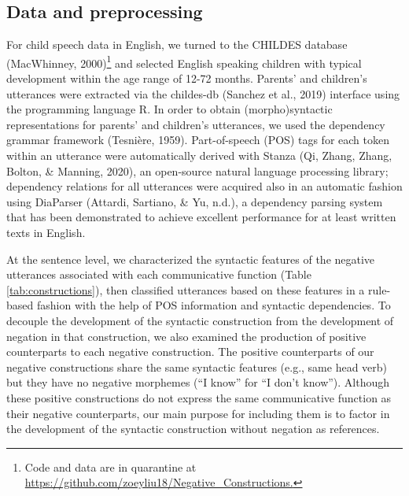 \documentclass[
  english,
  man,floatsintext]{apa6}
\begin{document}
\hypertarget{data-and-preprocessing}{%
\subsection{Data and preprocessing}\label{data-and-preprocessing}}

For child speech data in English, we turned to the CHILDES database (MacWhinney, 2000)\footnote{Code and data are in quarantine at \url{https://github.com/zoeyliu18/Negative_Constructions.}} and selected English speaking children with typical development within the age range of 12-72 months. Parents' and children's utterances were extracted via the childes-db (Sanchez et al., 2019) interface using the programming language R. In order to obtain (morpho)syntactic representations for parents' and children's utterances, we used the dependency grammar framework (Tesnière, 1959). Part-of-speech (POS) tags for each token within an utterance were automatically derived with Stanza (Qi, Zhang, Zhang, Bolton, \& Manning, 2020), an open-source natural language processing library; dependency relations for all utterances were acquired also in an automatic fashion using DiaParser (Attardi, Sartiano, \& Yu, n.d.), a dependency parsing system that has been demonstrated to achieve excellent performance for at least written texts in English.

At the sentence level, we characterized the syntactic features of the negative utterances associated with each communicative function (Table \ref{tab:constructions}), then classified utterances based on these features in a rule-based fashion with the help of POS information and syntactic dependencies. To decouple the development of the syntactic construction from the development of negation in that construction, we also examined the production of positive counterparts to each negative construction. The positive counterparts of our negative constructions share the same syntactic features (e.g., same head verb) but they have no negative morphemes (``I know'' for ``I don't know''). Although these positive constructions do not express the same communicative function as their negative counterparts, our main purpose for including them is to factor in the development of the syntactic construction without negation as references.
\end{document}

